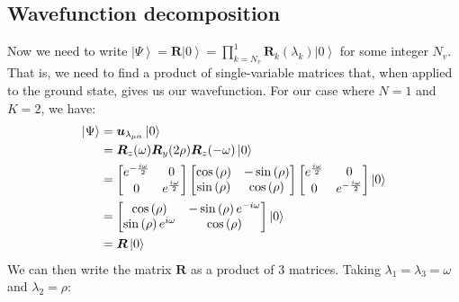 \documentclass{aux/ttuthes2007}
\newcommand{\ket}[1]{\ensuremath{\left|#1\right\rangle}}
\newcommand{\s}[1]{\sin\left( #1 \right)}
\newcommand{\co}[1]{\cos\left( #1 \right)}
\newcommand{\elec}{N}
\newcommand{\orb}{K}
\newcommand{\ind}[1]{{\uo #1 \oo #1}}
\newcommand{\uo}[1]{
		\IfEqCase{#1}{
			{0}{\mu}
			{1}{\nu}
			{2}{\xi}
		}[\PackageError{uo}{Undefined option to uo: #1}{}]
}
\newcommand{\oo}[1]{
		\IfEqCase{#1}{
			{0}{\alpha}
			{1}{\beta}
			{2}{\gamma}
		}[\PackageError{unocorb}{Undefined option to unuo: #1}{}]
}
\begin{document}
\subsection {\textbf{Wavefunction decomposition}}
Now we need to write $\ket \Psi = \bm R \ket 0 = \prod_{k=N_v}^1 \bm R_k(\lambda_k) \ket 0$ for some integer $N_v$. That is, we need to find a product of single-variable matrices that, when applied to the ground state, gives us our wavefunction.
For our case where $\elec = 1$ and $\orb = 2$, we have:
%
\begin{equation*}
\begin{split}
	\ket\Psi 
	&= \bm u_{\lambda_{\ind 0}} \ket 0 \\
	&= \bm R_z(\omega) \bm R_y(2\rho) \bm R_z(-\omega)
	\ket 0 \\
	&= 
	\begin{bmatrix}
		e^{-\frac{i\omega} 2} & 0 \\
		0 & e^{\frac{i\omega} 2}\\
	\end{bmatrix} 
	\begin{bmatrix}
		\co \rho & - \s \rho \\
		\s \rho  & \co \rho\\
	\end{bmatrix} 
	\begin{bmatrix}
		e^{\frac{i\omega} 2} & 0 \\
		0 & e^{-\frac{i\omega} 2}\\
	\end{bmatrix} 
	\ket 0 \\
	&=
	\begin{bmatrix}
		\co \rho & - \s \rho e^{-i\omega} \\
		\s \rho e^{i\omega} & \co \rho\\
	\end{bmatrix} 
	\ket 0 \\
	&= \bm R\ket 0
\end{split}
\end{equation*}
%
We can then write the matrix $\bm R$ as a product of 3 matrices. Taking $\lambda_1 = \lambda_3 = \omega$ and $\lambda_2 = \rho$:
%
\end{document}
